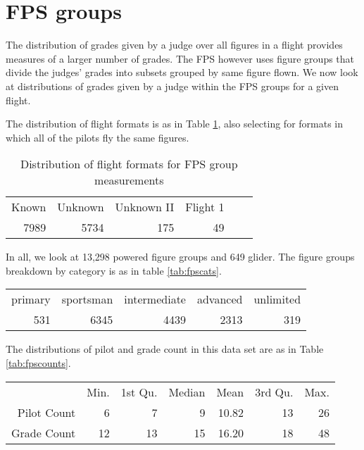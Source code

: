 \section{FPS groups}

The distribution of grades given by a judge over all figures in a flight
provides measures of a larger number of grades. The FPS however uses figure
groups that divide the judges' grades into subsets grouped by same figure
flown.  We now look at distributions of grades given by a judge within the FPS
groups for a given flight.

The distribution of flight formats is as in Table
\ref{tab:fpsformat}, also selecting for formats in which all of the pilots
fly the same figures.

\begin{table}[htbp]
  \centering
  \begin{tabular}{r r r r r r}
  Known & Unknown & Unknown II & Flight 1 \\
  7989 & 5734 & 175 & 49 \\
  \end{tabular}
  \caption{Distribution of flight formats for FPS group measurements}
  \label{tab:fpsformat}
\end{table}

In all, we look at 13,298 powered figure groups and 649 glider. The figure
groups breakdown by category is as in table \ref{tab:fpscats}.

\begin{table*}[tbp]
  \begin{tabular}{r r r r r}
  primary  & sportsman & intermediate  &  advanced  & unlimited  \\
      531  &      6345 &         4439  &      2313  &       319  \\
  \end{tabular}
  \caption{Distribution of categories for FPS group measurements}
  \label{tab:fpscats}
\end{table*}

The distributions of pilot and grade count in this data set are as in
Table \ref{tab:fpscounts}.

\begin{table*}[tbp]
  \begin{tabular}{r | r r r r r r}
  & Min. & 1st Qu. & Median & Mean & 3rd Qu. & Max. \\
  Pilot Count &  6 &  7 &  9 & 10.82 &  13 &  26 \\
  Grade Count & 12 & 13 & 15 & 16.20 & 18 & 48 \\
  \end{tabular}
  \caption{Distribution of pilot and grade counts for FPS group measurements}
  \label{tab:fpscounts}
\end{table*}

